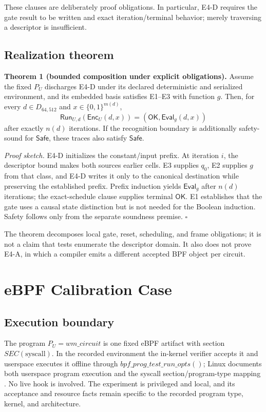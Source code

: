 \documentclass[conference]{IEEEtran}
\begin{document}
These clauses are deliberately proof obligations. In particular, E4-D requires the gate result to be written and exact iteration/terminal behavior; merely traversing a descriptor is insufficient.

\subsection{Realization theorem}

\medskip
\noindent\textbf{Theorem 1 (bounded composition under explicit obligations).}
Assume the fixed $P_U$ discharges E4-D under its declared deterministic and serialized environment, and its embedded basis satisfies E1--E3 with function $g$. Then, for every $d\in D_{64,512}$ and $x\in\{0,1\}^{m(d)}$,
\begin{equation}
\mathsf{Run}_{U,d}(\mathsf{Enc}_U(d,x))
=(\mathsf{OK},\mathsf{Eval}_g(d,x))
\end{equation}
after exactly $n(d)$ iterations. If the recognition boundary is additionally safety-sound for $\mathsf{Safe}$, these traces also satisfy $\mathsf{Safe}$.

\emph{Proof sketch.} E4-D initializes the constant/input prefix. At iteration $i$, the descriptor bound makes both sources earlier cells. E3 supplies $q_0$, E2 supplies $g$ from that class, and E4-D writes it only to the canonical destination while preserving the established prefix. Prefix induction yields $\mathsf{Eval}_g$ after $n(d)$ iterations; the exact-schedule clause supplies terminal $\mathsf{OK}$. E1 establishes that the gate uses a causal state distinction but is not needed for the Boolean induction. Safety follows only from the separate soundness premise. \hfill$\square$

The theorem decomposes local gate, reset, scheduling, and frame obligations; it is not a claim that tests enumerate the descriptor domain. It also does not prove E4-A, in which a compiler emits a different accepted BPF object per circuit.

\section{eBPF Calibration Case}

\subsection{Execution boundary}

The program $P_U=\mathit{wm\_circuit}$ is one fixed eBPF artifact with section $\mathit{SEC}(\text{syscall})$. In the recorded environment the in-kernel verifier accepts it and userspace executes it offline through $\mathit{bpf\_prog\_test\_run\_opts}()$; Linux documents both userspace program execution and the syscall section/program-type mapping \cite{ref6,ref7}. No live hook is involved. The experiment is privileged and local, and its acceptance and resource facts remain specific to the recorded program type, kernel, and architecture.
\end{document}
